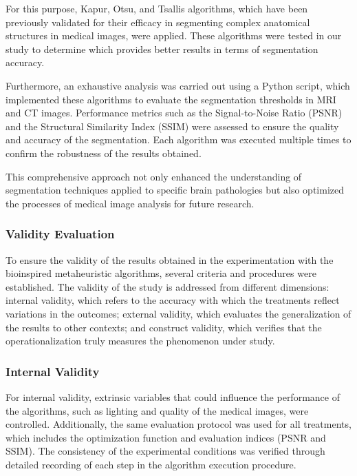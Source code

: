 \documentclass{elsarticle}
\begin{document}
\noindent For this purpose, Kapur, Otsu, and Tsallis algorithms, which have been previously validated for their efficacy in segmenting complex anatomical structures in medical images, were applied. These algorithms were tested in our study to determine which provides better results in terms of segmentation accuracy.

\noindent Furthermore, an exhaustive analysis was carried out using a Python script, which implemented these algorithms to evaluate the segmentation thresholds in MRI and CT images. Performance metrics such as the Signal-to-Noise Ratio (PSNR) and the Structural Similarity Index (SSIM) were assessed to ensure the quality and accuracy of the segmentation. Each algorithm was executed multiple times to confirm the robustness of the results obtained.

\noindent This comprehensive approach not only enhanced the understanding of segmentation techniques applied to specific brain pathologies but also optimized the processes of medical image analysis for future research.

\subsubsection{Validity Evaluation}

\noindent To ensure the validity of the results obtained in the experimentation with the bioinspired metaheuristic algorithms, several criteria and procedures were established. The validity of the study is addressed from different dimensions: internal validity, which refers to the accuracy with which the treatments reflect variations in the outcomes; external validity, which evaluates the generalization of the results to other contexts; and construct validity, which verifies that the operationalization truly measures the phenomenon under study.

\subsubsection{Internal Validity}
\noindent For internal validity, extrinsic variables that could influence the performance of the algorithms, such as lighting and quality of the medical images, were controlled. Additionally, the same evaluation protocol was used for all treatments, which includes the optimization function and evaluation indices (PSNR and SSIM). The consistency of the experimental conditions was verified through detailed recording of each step in the algorithm execution procedure.
\end{document}
